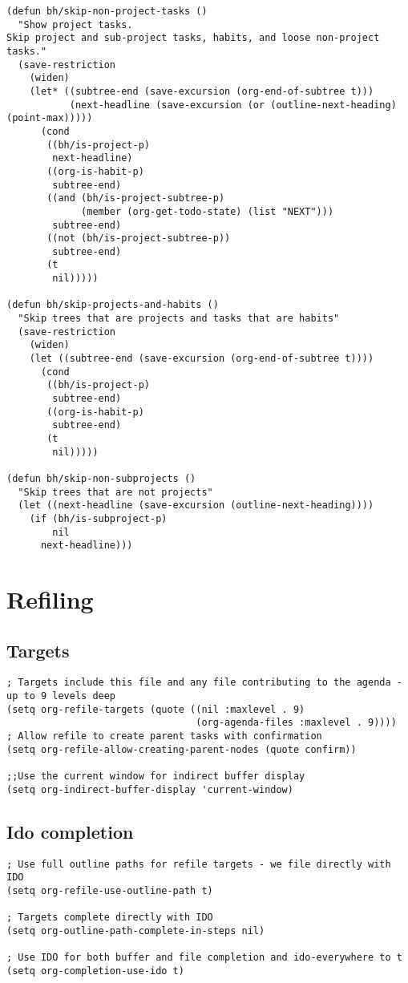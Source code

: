 \documentclass[11pt]{scrartcl}
\begin{document}
\begin{verbatim}
(defun bh/skip-non-project-tasks ()
  "Show project tasks.
Skip project and sub-project tasks, habits, and loose non-project tasks."
  (save-restriction
    (widen)
    (let* ((subtree-end (save-excursion (org-end-of-subtree t)))
           (next-headline (save-excursion (or (outline-next-heading) (point-max)))))
      (cond
       ((bh/is-project-p)
        next-headline)
       ((org-is-habit-p)
        subtree-end)
       ((and (bh/is-project-subtree-p)
             (member (org-get-todo-state) (list "NEXT")))
        subtree-end)
       ((not (bh/is-project-subtree-p))
        subtree-end)
       (t
        nil)))))

(defun bh/skip-projects-and-habits ()
  "Skip trees that are projects and tasks that are habits"
  (save-restriction
    (widen)
    (let ((subtree-end (save-excursion (org-end-of-subtree t))))
      (cond
       ((bh/is-project-p)
        subtree-end)
       ((org-is-habit-p)
        subtree-end)
       (t
        nil)))))

(defun bh/skip-non-subprojects ()
  "Skip trees that are not projects"
  (let ((next-headline (save-excursion (outline-next-heading))))
    (if (bh/is-subproject-p)
        nil
      next-headline)))
\end{verbatim}
\section{Refiling}
\label{sec:orgheadline45}

\subsection{Targets}
\label{sec:orgheadline42}

\begin{verbatim}
; Targets include this file and any file contributing to the agenda - up to 9 levels deep
(setq org-refile-targets (quote ((nil :maxlevel . 9)
                                 (org-agenda-files :maxlevel . 9))))
; Allow refile to create parent tasks with confirmation
(setq org-refile-allow-creating-parent-nodes (quote confirm))

;;Use the current window for indirect buffer display
(setq org-indirect-buffer-display 'current-window)
\end{verbatim}

\subsection{Ido completion}
\label{sec:orgheadline43}
\begin{verbatim}
; Use full outline paths for refile targets - we file directly with IDO
(setq org-refile-use-outline-path t)

; Targets complete directly with IDO
(setq org-outline-path-complete-in-steps nil)

; Use IDO for both buffer and file completion and ido-everywhere to t
(setq org-completion-use-ido t)
\end{verbatim}
\end{document}
